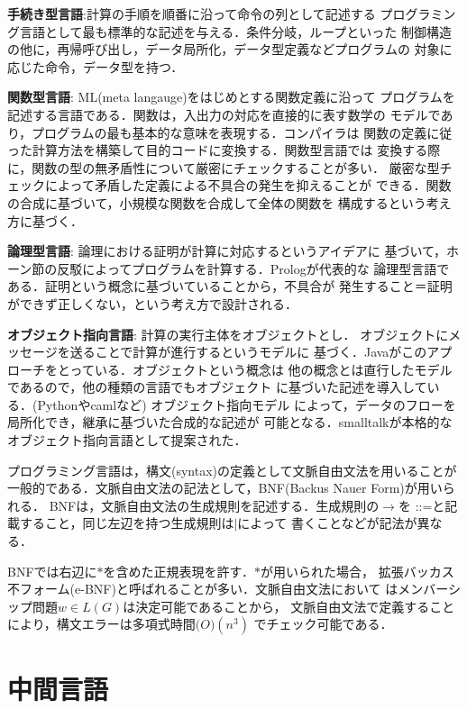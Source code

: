 \documentclass[a4j,dvipdfmx]{jbook}
\begin{document}
\begin{list}{}{}
  \item {\bf 手続き型言語}:計算の手順を順番に沿って命令の列として記述する
  プログラミング言語として最も標準的な記述を与える．条件分岐，ループといった
  制御構造の他に，再帰呼び出し，データ局所化，データ型定義などプログラムの
  対象に応じた命令，データ型を持つ．
  \item {\bf 関数型言語}: ML(meta langauge)をはじめとする関数定義に沿って
  プログラムを記述する言語である．関数は，入出力の対応を直接的に表す数学の
  モデルであり，プログラムの最も基本的な意味を表現する．コンパイラは
  関数の定義に従った計算方法を構築して目的コードに変換する．関数型言語では
  変換する際に，関数の型の無矛盾性について厳密にチェックすることが多い．
  厳密な型チェックによって矛盾した定義による不具合の発生を抑えることが
  できる．関数の合成に基づいて，小規模な関数を合成して全体の関数を
  構成するという考え方に基づく．
  \item {\bf 論理型言語}: 論理における証明が計算に対応するというアイデアに
  基づいて，ホーン節の反駁によってプログラムを計算する．Prologが代表的な
  論理型言語である．証明という概念に基づいていることから，不具合が
  発生すること＝証明ができず正しくない，という考え方で設計される．
  \item {\bf オブジェクト指向言語}: 計算の実行主体をオブジェクトとし．
  オブジェクトにメッセージを送ることで計算が進行するというモデルに
  基づく．Javaがこのアプローチをとっている．オブジェクトという概念は
  他の概念とは直行したモデルであるので，他の種類の言語でもオブジェクト
  に基づいた記述を導入している．(Pythonやcamlなど) オブジェクト指向モデル
  によって，データのフローを局所化でき，継承に基づいた合成的な記述が
  可能となる．smalltalkが本格的なオブジェクト指向言語として提案された．
\end{list}

プログラミング言語は，構文(syntax)の定義として文脈自由文法を用いることが
一般的である．文脈自由文法の記法として，BNF(Backus Nauer Form)が用いられる．
BNFは，文脈自由文法の生成規則を記述する．生成規則の$\rightarrow$を
$\texttt{::=}$と記載すること，同じ左辺を持つ生成規則は$\texttt{|}$によって
書くことなどが記法が異なる．

BNFでは右辺に$\ast$を含めた正規表現を許す．$\ast$が用いられた場合，
拡張バッカス不フォーム{(e-BNF)}と呼ばれることが多い．文脈自由文法において
はメンバーシップ問題$w\in L(G)$は決定可能であることから，
文脈自由文法で定義することにより，構文エラーは多項式時間$\mathcal(O)(n^3)$
でチェック可能である．

\section{中間言語}
\end{document}
